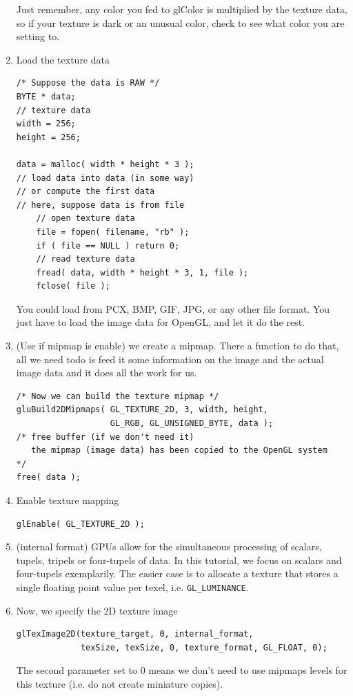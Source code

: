 \begin{enumerate}
\begin{itemize}
  \end{itemize}
  \begin{framed}
    Just remember, any color you fed to glColor is multiplied by the
    texture data, so if your texture is dark or an unusual color,
    check to see what color you are setting to.
  \end{framed}

\item Load the texture data
\begin{verbatim}
/* Suppose the data is RAW */
BYTE * data;
// texture data
width = 256;
height = 256;

data = malloc( width * height * 3 );
// load data into data (in some way)
// or compute the first data
// here, suppose data is from file
    // open texture data
    file = fopen( filename, "rb" );
    if ( file == NULL ) return 0;
    // read texture data
    fread( data, width * height * 3, 1, file );
    fclose( file );
\end{verbatim}
  You could load from PCX, BMP, GIF, JPG, or any other file
  format. You just have to load the image data for OpenGL, and let it
  do the rest. 

\item (Use if mipmap is enable) we create a mipmap. There a function
  to do that, all we need todo is feed it some information on the
  image and the actual image data and it does all the work for us.
\begin{verbatim}
/* Now we can build the texture mipmap */
gluBuild2DMipmaps( GL_TEXTURE_2D, 3, width, height,
                   GL_RGB, GL_UNSIGNED_BYTE, data );
/* free buffer (if we don't need it)
   the mipmap (image data) has been copied to the OpenGL system
*/
free( data );
\end{verbatim}

\item Enable texture mapping
\begin{verbatim}
glEnable( GL_TEXTURE_2D );
\end{verbatim}

\item (internal format) GPUs allow for the simultaneous processing of
  scalars, tupels, tripels or four-tupels of data. In this tutorial,
  we focus on scalars and four-tupels exemplarily. The easier case is
  to allocate a texture that stores a single floating point value per
  texel, i.e. \verb!GL_LUMINANCE!.

\item Now, we specify the 2D texture image
\begin{verbatim}
glTexImage2D(texture_target, 0, internal_format,
             texSize, texSize, 0, texture_format, GL_FLOAT, 0);
\end{verbatim}
The second parameter set to 0 means we don't need to use mipmaps
levels for this texture (i.e. do not create miniature copies). 


\end{enumerate}
